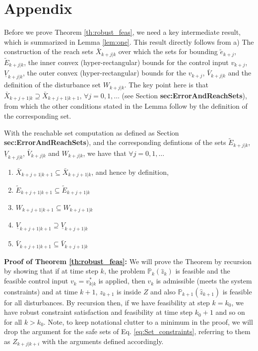 \section*{Appendix}

Before we prove Theorem \ref{th:robust_feas}, we need a key intermediate result, which is summarized in Lemma \ref{lem:one}. This result directly follows from a) The construction of the reach sets $\bar{X}_{k+j|k}$ over which the sets for bounding $\tilde{e}_{k+j}$, $\tilde{E}_{k+j|k}$, the inner convex (hyper-rectangular) bounds for the control input $v_{k+j}$, $\underline{V}_{k+j|k}$, the outer convex (hyper-rectangular) bounds for the  $v_{k+j}$, $\bar{V}_{k+j|k}$ and the definition of the disturbance set $W_{k+j|k}$. The key point here is that $\bar{X}_{k+j+1|k} \supseteq \bar{X}_{k+j+1|k+1}, \, \forall j=0,1,\dotsc$ (see Section \textbf{sec:ErrorAndReachSets}), from which the other conditions stated in the Lemma follow by the definition of the corresponding set.

\begin{lemma}
\label{lem:one}
With the reachable set computation as defined as Section \textbf{sec:ErrorAndReachSets}), and the corresponding defintions of the sets $\tilde{E}_{k+j|k}$, $\underline{V}_{k+j|k}$, $\bar{V}_{k+j|k}$ and $W_{k+j|k}$, we have that $\forall j=0,1,\dotsc$
\begin{enumerate}
\item $\bar{X}_{k+j+1|k+1} \subseteq \bar{X}_{k+j+1|k}$, and hence by definition,
\item $\tilde{E}_{k+j+1|k+1} \subseteq \tilde{E}_{k+j+1|k}$
\item ${W}_{k+j+1|k+1} \subseteq {W}_{k+j+1|k}$
\item $\underline{V}_{k+j+1|k+1} \supseteq \underline{V}_{k+j+1|k}$
\item $\bar{V}_{k+j+1|k+1} \subseteq \bar{V}_{k+j+1|k}$
\end{enumerate}
\end{lemma} 

\textbf{Proof of Theorem \ref{th:robust_feas}:} We will prove the Theorem by recursion by showing that if at time step $k$, the problem $\mathbb{P}_{k}(\hat{z}_k)$ is feasible and the feasible control input $v_k = v^{*}_{k|k}$ is applied, then $v_k$ is admissible (meets the system constraints) and at time $k+1$, $z_{k+1}$ is inside $Z$ and also $\mathbb{P}_{k+1}(\hat{z}_{k+1})$ is feasible for all disturbances. By recursion then, if we have feasibility at step $k=k_0$, we have robust constraint satisfaction and feasibility at time step $k_0+1$ and so on for all $k>k_0$. Note, to keep notational clutter to a minimum in the proof, we will drop the argument for the safe sets of Eq. \ref{eq:Set_constraints}, referring to them as $Z_{k+j|k+i}$ with the arguments defined accordingly.

